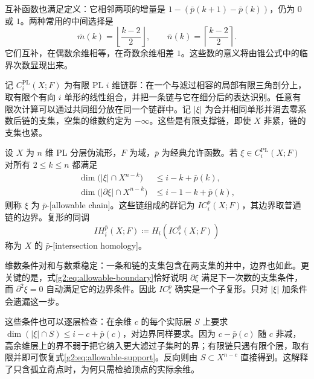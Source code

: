 互补函数也满足定义：它相邻两项的增量是 \(1-(\bar p(k+1)-\bar p(k))\)，仍为 \(0\) 或 \(1\)。两种常用的中间选择是
\begin{equation}\label{g2:eq:middle-perversities}
	\bar m(k)=\left\lfloor\frac{k-2}{2}\right\rfloor,
	\qquad
	\bar n(k)=\left\lceil\frac{k-2}{2}\right\rceil.
\end{equation}
它们互补，在偶数余维相等，在奇数余维相差 \(1\)。这些数的意义将由锥公式中的临界次数显现出来。

\ProseParagraphBreak

记 \(C_i^{\mathrm{PL}}(X;F)\) 为有限 PL \(i\) 维链群：在一个与滤过相容的局部有限三角剖分上，取有限个有向 \(i\) 单形的线性组合，并把一条链与它在细分后的表达识别。任意有限次计算可以通过共同细分放在同一个链群中。记 \(|\xi|\) 为合并相同单形并消去零系数后链的支集，空集的维数约定为 \(-\infty\)。这些是有限支撑链，即使 \(X\) 非紧，链的支集也紧。

\begin{definition}\label{g2:def:intersection-chain-complex}
	设 \(X\) 为 \(n\) 维 PL 分层伪流形，\(F\) 为域，\(\bar p\) 为经典允许函数。若 \(\xi\in C_i^{\mathrm{PL}}(X;F)\) 对所有 \(2\le k\le n\) 都满足
	\begin{align}
		\dim\bigl(|\xi|\cap X^{n-k}\bigr)&\le i-k+\bar p(k),\label{g2:eq:allowable-support}\\
		\dim\bigl(|\partial\xi|\cap X^{n-k}\bigr)&\le i-1-k+\bar p(k),\label{g2:eq:allowable-boundary}
	\end{align}
	则称 \(\xi\) 为 \(\bar p\)-[allowable chain]。这些链组成的群记为 \(IC_i^{\bar p}(X;F)\)，其边界取普通链的边界。复形的同调
	\[
		IH_i^{\bar p}(X;F)\coloneqq H_i(IC_*^{\bar p}(X;F))
	\]
	称为 \(X\) 的 \(\bar p\)-[intersection homology]。
\end{definition}

维数条件对和与数乘稳定：一条和链的支集包含在两支集的并中，边界也如此。更关键的是，式\eqref{g2:eq:allowable-boundary}恰好说明 \(\partial\xi\) 满足下一次数的支集条件，而 \(\partial^2\xi=0\) 自动满足它的边界条件。因此 \(IC_*^{\bar p}\) 确实是一个子复形。只对 \(|\xi|\) 加条件会遗漏这一步。

\ProseParagraphBreak

这些条件也可以逐层检查：在余维 \(c\) 的每个实际层 \(S\) 上要求 \(\dim(|\xi|\cap S)\le i-c+\bar p(c)\)，对边界同样要求。因为 \(c-\bar p(c)\) 随 \(c\) 非减，高余维层上的界不弱于把它纳入更大滤过子集时的界；有限链只遇有限个层，取有限并即可恢复式\eqref{g2:eq:allowable-support}。反向则由 \(S\subset X^{n-c}\) 直接得到。这解释了只含孤立奇点时，为何只需检验顶点的实际余维。

